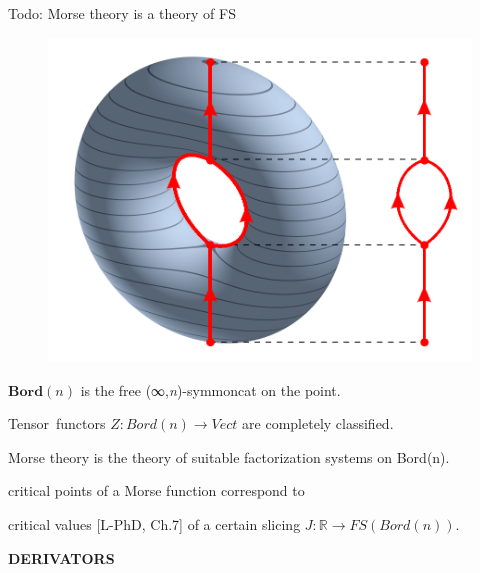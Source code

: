 \documentclass{beamer}
\begin{document}
\begin{frame}{Todo: Morse theory is a theory of FS}
  \begin{figure}
\includegraphics[scale=.15]{3D-Leveltorus-Reebgraph.png}
  \end{figure}

  $\textbf{Bord}(n)$ is the free (∞,\emph{n})-symmoncat on the point.

  \vspace{1cm}
  Tensor~functors $Z : Bord(n) \to Vect$ are completely classified.

  \vspace{1cm}
  Morse theory is the theory of suitable factorization systems on Bord(n).

  \alert{critical points of a Morse function}
  correspond to

 \alert{critical values} [\alert{L-PhD}, Ch.7] of a certain slicing $J : \mathbb R \to FS(Bord(n))$.
\end{frame}
%
%
%
%
%
%
%
\begin{frame}
  \Huge\centering \bfseries DERIVATORS
\end{frame}
%
\end{document}
